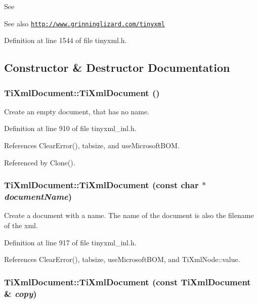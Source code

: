 See \begin{DoxySeeAlso}{See also}
\href{http://www.grinninglizard.com/tinyxml}{\tt http://www.grinninglizard.com/tinyxml} 
\end{DoxySeeAlso}


Definition at line 1544 of file tinyxml.h.

\subsection{Constructor \& Destructor Documentation}
\hypertarget{class_ti_xml_document_a9f5e84335708fde98400230f9f12659c}{
\subsubsection[{TiXmlDocument}]{\setlength{\rightskip}{0pt plus 5cm}TiXmlDocument::TiXmlDocument ()}}
\label{class_ti_xml_document_a9f5e84335708fde98400230f9f12659c}


Create an empty document, that has no name. 

Definition at line 910 of file tinyxml\_\-inl.h.

References ClearError(), tabsize, and useMicrosoftBOM.

Referenced by Clone().\hypertarget{class_ti_xml_document_ae4508b452d0c3061db085f3db27b8396}{
\subsubsection[{TiXmlDocument}]{\setlength{\rightskip}{0pt plus 5cm}TiXmlDocument::TiXmlDocument (const char $\ast$ {\em documentName})}}
\label{class_ti_xml_document_ae4508b452d0c3061db085f3db27b8396}


Create a document with a name. The name of the document is also the filename of the xml. 

Definition at line 917 of file tinyxml\_\-inl.h.

References ClearError(), tabsize, useMicrosoftBOM, and TiXmlNode::value.\hypertarget{class_ti_xml_document_a323a7486e7da6099cdc19a5ff7e74b07}{
\subsubsection[{TiXmlDocument}]{\setlength{\rightskip}{0pt plus 5cm}TiXmlDocument::TiXmlDocument (const {\bf TiXmlDocument} \& {\em copy})}}
\label{class_ti_xml_document_a323a7486e7da6099cdc19a5ff7e74b07}


